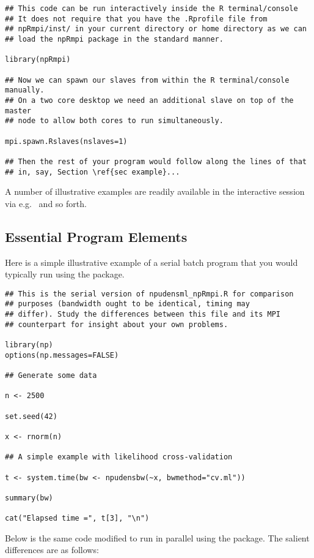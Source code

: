 \documentclass[nojss]{jss}
\begin{document}
\begin{verbatim}
## This code can be run interactively inside the R terminal/console
## It does not require that you have the .Rprofile file from
## npRmpi/inst/ in your current directory or home directory as we can
## load the npRmpi package in the standard manner.

library(npRmpi)

## Now we can spawn our slaves from within the R terminal/console manually. 
## On a two core desktop we need an additional slave on top of the master
## node to allow both cores to run simultaneously.

mpi.spawn.Rslaves(nslaves=1)

## Then the rest of your program would follow along the lines of that 
## in, say, Section \ref{sec example}...
\end{verbatim}

A number of illustrative examples are readily available in the
interactive session via  e.g.~
and so forth.

\subsection{Essential Program Elements}\label{sec example}

Here is a simple illustrative example of a serial batch program that
you would typically run using the  package.
\begin{verbatim}
## This is the serial version of npudensml_npRmpi.R for comparison
## purposes (bandwidth ought to be identical, timing may
## differ). Study the differences between this file and its MPI
## counterpart for insight about your own problems.

library(np)
options(np.messages=FALSE)

## Generate some data

n <- 2500

set.seed(42)

x <- rnorm(n)

## A simple example with likelihood cross-validation

t <- system.time(bw <- npudensbw(~x, bwmethod="cv.ml"))

summary(bw)

cat("Elapsed time =", t[3], "\n")
\end{verbatim}

Below is the same code modified to run in parallel using the
 package. The salient differences are as follows:
\end{document}
